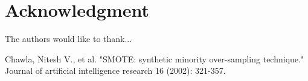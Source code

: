 \documentclass[10pt,journal,compsoc]{IEEEtran}
\begin{document}
  \section*{Acknowledgment}
\fi


The authors would like to thank...


\ifCLASSOPTIONcaptionsoff
  \newpage
\fi





%
%
%
\begin{thebibliography}{10}

Chawla, Nitesh V., et al. "SMOTE: synthetic minority over-sampling technique." Journal of artificial intelligence research 16 (2002): 321-357.



\end{thebibliography}



% 
\end{document}
